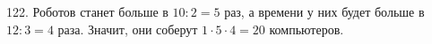 122. Роботов станет больше в $10:2=5$ раз, а времени у них будет больше в $12:3=4$ раза. Значит, они соберут $1\cdot5\cdot4=20$ компьютеров.\\
